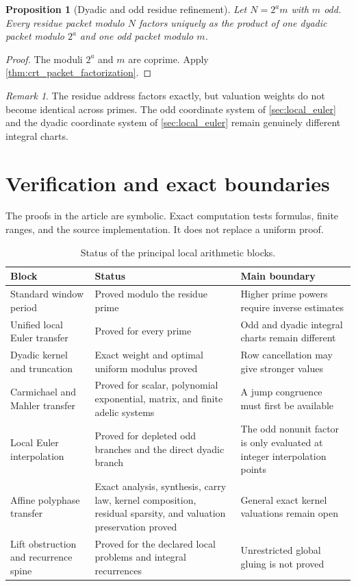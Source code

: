 \documentclass{aomart}
\newtheorem{proposition}[proposition]{Proposition}
\theoremstyle{definition}
\theoremstyle{remark}
\newtheorem{remark}[remark]{Remark}
\begin{document}
\begin{proposition}[Dyadic and odd residue refinement]\label{prop:dyadic_odd_refinement}
Let \(N=2^am\) with \(m\) odd. Every residue packet modulo \(N\) factors uniquely as the product of one dyadic packet modulo \(2^a\) and one odd packet modulo \(m\).
\end{proposition}

\begin{proof}
The moduli \(2^a\) and \(m\) are coprime. Apply \cref{thm:crt_packet_factorization}.
\end{proof}

\begin{remark}\label{rem:crt_weight_boundary}
The residue address factors exactly, but valuation weights do not become identical across primes. The odd coordinate system of \cref{sec:local_euler} and the dyadic coordinate system of \cref{sec:local_euler} remain genuinely different integral charts.
\end{remark}

\section{Verification and exact boundaries}\label{sec:boundaries}

The proofs in the article are symbolic. Exact computation tests formulas, finite ranges, and the source implementation. It does not replace a uniform proof.

\begin{table}[t]
\centering
\caption{Status of the principal local arithmetic blocks.}
\label{tab:status}
\begin{tabular}{>{\raggedright\arraybackslash}p{}>{\raggedright\arraybackslash}p{}>{\raggedright\arraybackslash}p{}}
\toprule
Block & Status & Main boundary\\
\midrule
Standard window period & Proved modulo the residue prime & Higher prime powers require inverse estimates\\
Unified local Euler transfer & Proved for every prime & Odd and dyadic integral charts remain different\\
Dyadic kernel and truncation & Exact weight and optimal uniform modulus proved & Row cancellation may give stronger values\\
Carmichael and Mahler transfer & Proved for scalar, polynomial exponential, matrix, and finite adelic systems & A jump congruence must first be available\\
Local Euler interpolation & Proved for depleted odd branches and the direct dyadic branch & The odd nonunit factor is only evaluated at integer interpolation points\\
Affine polyphase transfer & Exact analysis, synthesis, carry law, kernel composition, residual sparsity, and valuation preservation proved & General exact kernel valuations remain open\\
Lift obstruction and recurrence spine & Proved for the declared local problems and integral recurrences & Unrestricted global gluing is not proved\\
\bottomrule
\end{tabular}
\end{table}
\end{document}
